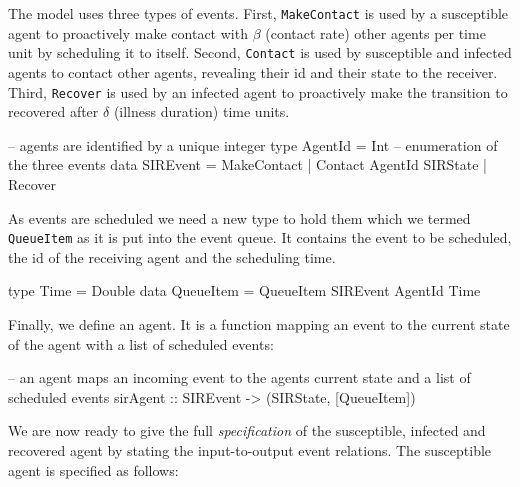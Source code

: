 The model uses three types of events. First, \texttt{MakeContact} is used by a susceptible agent to proactively make contact with $\beta$ (contact rate) other agents per time unit by scheduling it to itself. Second, \texttt{Contact} is used by susceptible and infected agents to contact other agents, revealing their id and their state to the receiver. Third, \texttt{Recover} is used by an infected agent to proactively make the transition to recovered after $\delta$ (illness duration) time units.

\begin{HaskellCode}
-- agents are identified by a unique integer
type AgentId = Int
-- enumeration of the three events
data SIREvent = MakeContact | Contact AgentId SIRState | Recover 
\end{HaskellCode}

As events are scheduled we need a new type to hold them which we termed \texttt{QueueItem} as it is put into the event queue. It contains the event to be scheduled, the id of the receiving agent and the scheduling time.

\begin{HaskellCode}
type Time      = Double
data QueueItem = QueueItem SIREvent AgentId Time
\end{HaskellCode}

Finally, we define an agent. It is a function mapping an event to the current state of the agent with a list of scheduled events:

\begin{HaskellCode}
-- an agent maps an incoming event to the agents current state and a list of scheduled events
sirAgent :: SIREvent -> (SIRState, [QueueItem])
\end{HaskellCode}


We are now ready to give the full \textit{specification} of the susceptible, infected and recovered agent by stating the input-to-output event relations. The susceptible agent is specified as follows:

